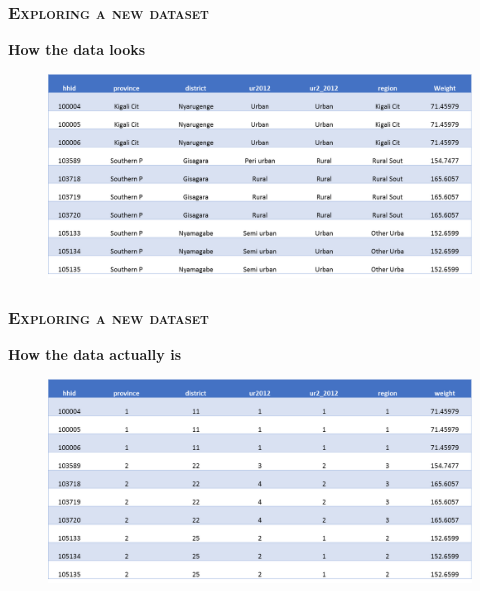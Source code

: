 \documentclass[10pt]{beamer}
\begin{document}
	\begin{frame}
		\frametitle{\textsc{Exploring a new dataset}}
		\begin{center}
			\Large\textbf{How the data looks}
		\end{center}	
		\begin{figure}[H] 
			\centering
			\includegraphics[width=0.9\linewidth]{dataset1}
		\end{figure}
	\end{frame}
	\begin{frame}
		\frametitle{\textsc{Exploring a new dataset}}
		\begin{center}
			\Large\textbf{How the data actually is}
		\end{center}	
		\begin{figure}[H] 
			\centering
			\includegraphics[width=0.9\linewidth]{dataset2}
	\end{figure}	
	\end{frame}
\end{document}
